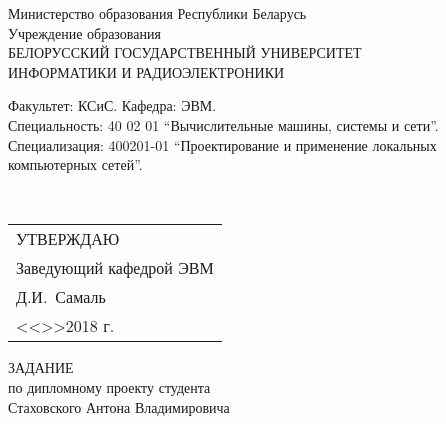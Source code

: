 {
    \thispagestyle{empty}
    \setlength{\parindent}{0em}

    \newcommand{\lineunderscore}{\uline{\hspace*{\fill}}}

    \begin{center}
        Министерство образования Республики Беларусь\\[1em]
        Учреждение образования\\
        БЕЛОРУССКИЙ ГОСУДАРСТВЕННЫЙ УНИВЕРСИТЕТ \\
        ИНФОРМАТИКИ И РАДИОЭЛЕКТРОНИКИ\\[1em]
    \end{center}

    \begin{minipage}{\textwidth}
        \begin{flushleft}
            Факультет: КСиС. Кафедра: ЭВМ. \\
            Специальность: 40 02 01 ``Вычислительные машины, системы и сети''.
            Специализация: 400201-01 ``Проектирование и применение локальных компьютерных сетей''.
        \end{flushleft}
    \end{minipage}\\[1em]

    \begin{minipage}{\textwidth}
        \begin{flushright}
            \begin{tabular}{p{}}
                УТВЕРЖДАЮ \\
                Заведующий кафедрой ЭВМ \\
                \underline{\hspace*{5em}}Д.И.~Самаль \\
                <<\underline{\hspace*{4ex}}>>\underline{\hspace*{6em}}2018 г.
            \end{tabular}
        \end{flushright}
    \end{minipage}

    \begin{center}
        ЗАДАНИЕ \\
        по дипломному проекту студента \\
        Стаховского Антона Владимировича
    \end{center}

}
